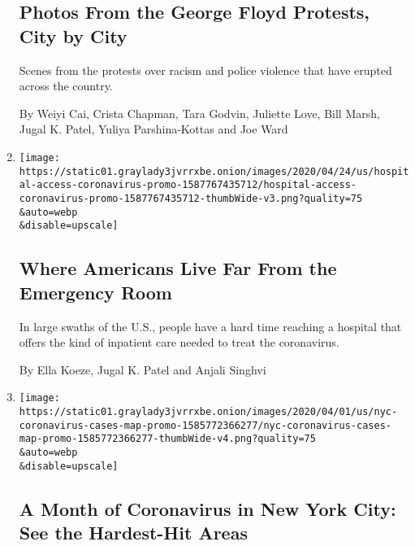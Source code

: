 \begin{enumerate}
  \hypertarget{photos-from-the-george-floyd-protests-city-by-city}{%
  \subsection{Photos From the George Floyd Protests, City by
  City}\label{photos-from-the-george-floyd-protests-city-by-city}}

  Scenes from the protests over racism and police violence that have
  erupted across the country.

  By Weiyi Cai, Crista Chapman, Tara Godvin, Juliette Love, Bill Marsh,
  Jugal K. Patel, Yuliya Parshina-Kottas and Joe Ward
\item
  \href{/interactive/2020/04/26/us/us-hospital-access-coronavirus.html}{}

  \texttt{[image: https://static01.graylady3jvrrxbe.onion/images/2020/04/24/us/hospital-access-coronavirus-promo-1587767435712/hospital-access-coronavirus-promo-1587767435712-thumbWide-v3.png?quality=75\\\&auto=webp\\\&disable=upscale]}

  \hypertarget{where-americans-live-far-from-the-emergency-room}{%
  \subsection{Where Americans Live Far From the Emergency
  Room}\label{where-americans-live-far-from-the-emergency-room}}

  In large swaths of the U.S., people have a hard time reaching a
  hospital that offers the kind of inpatient care needed to treat the
  coronavirus.

  By Ella Koeze, Jugal K. Patel and Anjali Singhvi
\item
  \href{/interactive/2020/04/01/nyregion/nyc-coronavirus-cases-map.html}{}

  \texttt{[image: https://static01.graylady3jvrrxbe.onion/images/2020/04/01/us/nyc-coronavirus-cases-map-promo-1585772366277/nyc-coronavirus-cases-map-promo-1585772366277-thumbWide-v4.png?quality=75\\\&auto=webp\\\&disable=upscale]}

  \hypertarget{a-month-of-coronavirus-in-new-york-city-see-the-hardest-hit-areas}{%
  \subsection{A Month of Coronavirus in New York City: See the
  Hardest-Hit
  Areas}\label{a-month-of-coronavirus-in-new-york-city-see-the-hardest-hit-areas}}


\end{enumerate}

